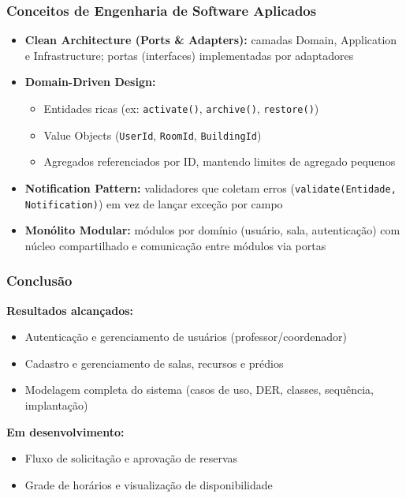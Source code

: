 \documentclass[11pt, xcolor={dvipsnames}, usepdftitle=false]{beamer}
\begin{document}
\begin{frame}
\frametitle{Conceitos de Engenharia de Software Aplicados}
\begin{itemize}
\item \textbf{Clean Architecture (Ports \& Adapters):} camadas Domain, Application e Infrastructure; portas (interfaces) implementadas por adaptadores
\item \textbf{Domain-Driven Design:}
\begin{itemize}
\item Entidades ricas (ex: \texttt{activate()}, \texttt{archive()}, \texttt{restore()})
\item Value Objects (\texttt{UserId}, \texttt{RoomId}, \texttt{BuildingId})
\item Agregados referenciados por ID, mantendo limites de agregado pequenos
\end{itemize}
\item \textbf{Notification Pattern:} validadores que coletam erros (\texttt{validate(Entidade, Notification)}) em vez de lançar exceção por campo
\item \textbf{Monólito Modular:} módulos por domínio (usuário, sala, autenticação) com núcleo compartilhado e comunicação entre módulos via portas
\end{itemize}
\end{frame}

\begin{frame}
\frametitle{Conclusão}
\textbf{Resultados alcançados:}
\begin{itemize}
\item Autenticação e gerenciamento de usuários (professor/coordenador)
\item Cadastro e gerenciamento de salas, recursos e prédios
\item Modelagem completa do sistema (casos de uso, DER, classes, sequência, implantação)
\end{itemize}
\vspace{3mm}
\textbf{Em desenvolvimento:}
\begin{itemize}
\item Fluxo de solicitação e aprovação de reservas
\item Grade de horários e visualização de disponibilidade
\end{itemize}
\end{frame}

\end{document}
